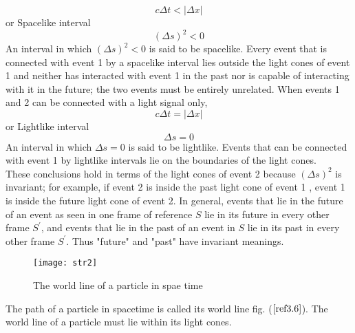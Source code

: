 $$
c \Delta t<|\Delta x|
$$
or
Spacelike interval
$$(\Delta s)^{2}<0$$
An interval in which $(\Delta s)^{2}<0$ is said to be spacelike. Every event that is connected with event 1 by a spacelike interval lies outside the light cones of event 1 and neither has interacted with event 1 in the past nor is capable of interacting with it in the future; the two events must be entirely unrelated.
When events 1 and 2 can be connected with a light signal only,
$$
c \Delta t=|\Delta x|
$$
or
Lightlike interval
$$
\Delta s=0
$$
An interval in which $\Delta s=0$ is said to be lightlike. Events that can be connected with event 1 by lightlike intervals lie on the boundaries of the light cones.\\
These conclusions hold in terms of the light cones of event 2 because $(\Delta s)^{2}$ is invariant; for example, if event 2 is inside the past light cone of event 1 , event 1 is inside the future light cone of event 2. In general, events that lie in the future of an event as seen in one frame of reference $S$ lie in its future in every other frame $S^{\prime}$, and events that lie in the past of an event in $S$ lie in its past in every other frame $S^{\prime}$. Thus "future" and "past" have invariant meanings.
\begin{figure}[H]
	\centering
	\texttt{[image: str2]}
	\caption{The world line of a particle in spae time}
	\label{ref3.6}
\end{figure}
The path of a particle in spacetime is called its world line fig. ($\ref{ref3.6}$). The world line of a particle must lie within its light cones.












